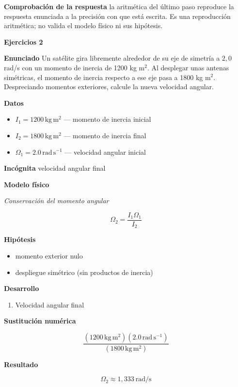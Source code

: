 \documentclass[10pt,openany]{book}
\begin{document}
\noindent\textbf{Comprobación de la respuesta} la aritmética del último paso reproduce la respuesta enunciada a la precisión con que está escrita. Es una reproducción aritmética; no valida el modelo físico ni sus hipótesis.

\noindent\textbf{Ejercicios 2}

\noindent\textbf{Enunciado}
Un satélite gira libremente alrededor de su eje de simetría a \(2{,}0\) rad/s con un momento de inercia de 1200 kg m\(^2\). Al desplegar unas antenas simétricas, el momento de inercia respecto a ese eje pasa a 1800 kg m\(^2\). Despreciando momentos exteriores, calcule la nueva velocidad angular.

\noindent\textbf{Datos}
\begin{itemize}
\item $I_{1} = 1200\,\mathrm{kg}\,\mathrm{m}^{2}$ — momento de inercia inicial
\item $I_{2} = 1800\,\mathrm{kg}\,\mathrm{m}^{2}$ — momento de inercia final
\item $\Omega_{1} = 2.0\,\mathrm{rad}\,\mathrm{s}^{-1}$ — velocidad angular inicial
\end{itemize}

\noindent\textbf{Incógnita}
velocidad angular final

\noindent\textbf{Modelo físico}

\noindent\textit{Conservación del momento angular}

\[
\Omega_2 = \frac{I_1\Omega_1}{I_2}
\]

\noindent\textbf{Hipótesis}
\begin{itemize}
\item momento exterior nulo
\item despliegue simétrico (sin productos de inercia)
\end{itemize}

\noindent\textbf{Desarrollo}
\begin{enumerate}
\item
Velocidad angular final
\end{enumerate}

\noindent\textbf{Sustitución numérica}

\[
\frac{\left(1200\,\mathrm{kg}\,\mathrm{m}^{2}\right) \left(2.0\,\mathrm{rad}\,\mathrm{s}^{-1}\right)}{\left(1800\,\mathrm{kg}\,\mathrm{m}^{2}\right)}
\]

\noindent\textbf{Resultado}

\[
\Omega_2 \approx 1{,}333\ \mathrm{rad/s}
\]
\end{document}
